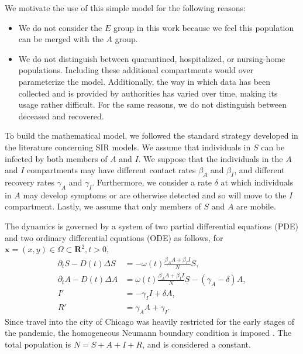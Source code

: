 \documentclass[11pt]{article}
\newcommand{\R}{\mathbf{R}}
\renewcommand\vec{\mathbf}
\begin{document}
		We motivate the use of this simple model for the following reasons:
		\begin{itemize}
			\item
				We do not consider the $E$ group in this work because we feel this population can be merged with the $A$ group.
			\item
				We do not distinguish between quarantined, hospitalized, or nursing-home populations.
				Including these additional compartments would over parameterize the model.
				Additionally, the way in which data has been collected and is provided by authorities has varied over time, making its usage rather difficult.
				For the same reasons, we do not distinguish between deceased and recovered.
		\end{itemize}
	
		To build the mathematical model, we followed the standard strategy developed in the literature concerning SIR models.
		We assume that individuals in $S$ can be infected by both members of $A$ and $I$.
		We suppose that the individuals in the $A$ and $I$ compartments may have different contact rates $\beta_A$ and $\beta_I$, and different recovery rates $\gamma_A$ and $\gamma_I$.
		Furthermore, we consider a rate $\delta$ at which individuals in $A$ may develop symptoms or are otherwise detected and so will move to the $I$ compartment.
		Lastly, we assume that only members of $S$ and $A$ are mobile.
		
		The dynamics is governed by a system of two partial differential equations (PDE) and two ordinary differential equations (ODE) as follows, for $\vec{x} = (x,y) \in \Omega \subset \R^2, t > 0$,
		\begin{equation} \label{eq:model}
			\begin{aligned}
				\partial_t S - D(t) \Delta S &= - \omega(t) \frac{\beta_A A + \beta_I I}{N} S, \\
				\partial_t A - D(t) \Delta A &= \omega(t) \frac{\beta_A A + \beta_I I}{N} S - (\gamma_A - \delta) A, \\
				I' &= - \gamma_I I + \delta A, \\
				R' &= \gamma_A A + \gamma_I.
			\end{aligned}
		\end{equation}
		Since travel into the city of Chicago was heavily restricted for the early stages of the pandemic, the homogeneous Neumann boundary condition is imposed \cite{Mammeri+2020+102+113}.
		The total population is $N = S + A + I + R$, and is considered a constant.
	
\end{document}
